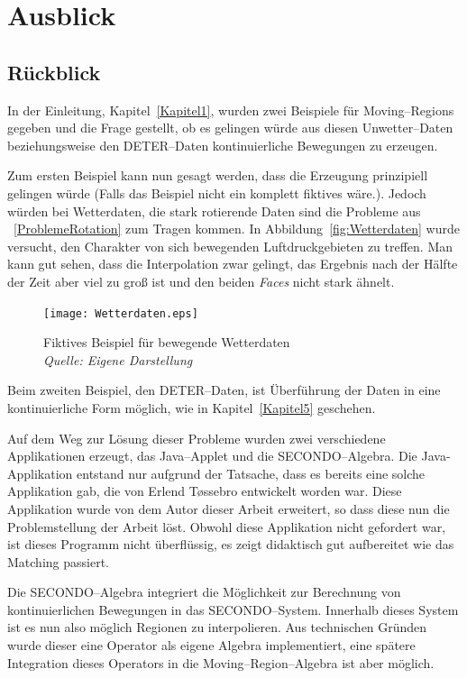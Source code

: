 
\chapter[Ausblick ]{Ausblick} \label{Kapitel6}

\section*{Rückblick}

In der Einleitung, Kapitel~\vref{Kapitel1}, wurden zwei Beispiele für Moving--Regions gegeben und die Frage gestellt, ob es gelingen würde aus diesen Unwetter--Daten beziehungsweise den DETER--Daten kontinuierliche Bewegungen zu erzeugen. 

Zum ersten Beispiel kann nun gesagt werden, dass die Erzeugung prinzipiell gelingen würde (Falls das Beispiel nicht ein komplett fiktives wäre.). Jedoch würden bei Wetterdaten, die stark rotierende Daten sind die Probleme aus ~\vref{ProblemeRotation} zum Tragen kommen. In Abbildung~\vref{fig:Wetterdaten} wurde versucht, den Charakter von sich bewegenden Luftdruckgebieten zu treffen. Man kann gut sehen, dass die Interpolation zwar gelingt, das Ergebnis nach der Hälfte der Zeit aber viel zu groß ist und den beiden \textit{Faces} nicht stark ähnelt.

\begin{figure}
	\centering
	\texttt{[image: Wetterdaten.eps]}
	\caption[Bewegende Wetterdaten]{Fiktives Beispiel für bewegende Wetterdaten\\\textit{Quelle: Eigene Darstellung}}
	\label{fig:Wetterdaten}
\end{figure}
Beim zweiten Beispiel, den DETER--Daten, ist Überführung der Daten in eine kontinuierliche Form möglich, wie in Kapitel~\vref{Kapitel5} geschehen.


Auf dem Weg zur Lösung dieser Probleme wurden zwei verschiedene Applikationen erzeugt, das Java--Applet und die SECONDO--Algebra. 
Die Java-Applikation entstand nur aufgrund der Tatsache, dass es bereits eine solche Applikation gab, die von Erlend T\o{}ssebro entwickelt worden war. Diese Applikation wurde von dem Autor dieser Arbeit erweitert, so dass diese nun die Problemstellung der Arbeit löst. Obwohl diese Applikation nicht gefordert war, ist dieses Programm nicht überflüssig, es zeigt didaktisch gut aufbereitet wie das Matching passiert.

Die SECONDO--Algebra integriert die Möglichkeit zur Berechnung von kontinuierlichen Bewegungen in das SECONDO--System. Innerhalb dieses System ist es nun also möglich Regionen zu interpolieren. Aus technischen Gründen wurde dieser eine Operator als eigene Algebra implementiert, eine spätere Integration dieses Operators in die Moving--Region--Algebra ist aber möglich.




